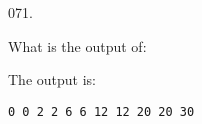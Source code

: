 \documentclass[]{book}
\newenvironment{Shaded}{}{}
\newcommand{\BuiltInTok}[1]{#1}
\newcommand{\ControlFlowTok}[1]{\textcolor[rgb]{0.00,0.44,0.13}{\textbf{#1}}}
\newcommand{\DataTypeTok}[1]{\textcolor[rgb]{0.56,0.13,0.00}{#1}}
\newcommand{\DecValTok}[1]{\textcolor[rgb]{0.25,0.63,0.44}{#1}}
\newcommand{\NormalTok}[1]{#1}
\newcommand{\StringTok}[1]{\textcolor[rgb]{0.25,0.44,0.63}{#1}}
\begin{document}
\begin{minipage}{\linewidth}\noindent
{\tiny 071.}\\
\begin{minipage}[t]{.485\linewidth}

What is the output of:

\begin{framed}

\begin{Shaded}
\end{Shaded}

\end{framed}

\end{minipage}
\hfill
\begin{minipage}[t]{.485\linewidth}

The output is:

\begin{framed}

\begin{verbatim}
0 0 2 2 6 6 12 12 20 20 30 
\end{verbatim}

\end{framed}

\end{minipage}
\end{minipage}

\vspace{2mm}\noindent\hrulefill{}
\end{document}
